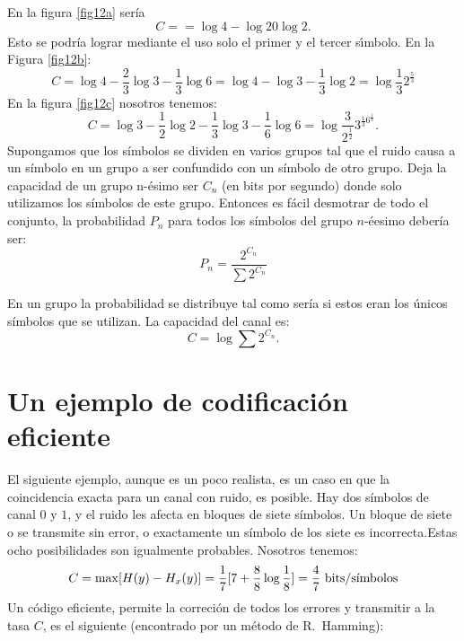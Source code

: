 En la figura \ref{fig12a} ser\'ia
\begin{equation}
  C = = \log{4} - \log{2} 0 \log{2}.
\end{equation}
Esto se podr\'ia lograr mediante el uso solo el primer y el tercer
s\'{\i}mbolo. En la Figura \ref{fig12b}:
\begin{equation}
  C = \log{4} - \frac{2}{3}\log{3} - \frac{1}{3}\log{6}
  = \log{4} - \log{3} - \frac{1}{3}\log{2}
  = \log{\frac{1}{3}} 2^{\frac{5}{3}}
\end{equation}
En la figura \ref{fig12c} nosotros tenemos:
\begin{equation}
  C = \log{3} - \frac{1}{2}\log{2} - \frac{1}{3}\log{3} - \frac{1}{6} \log{6}
  = \log  {\frac{3}{ 2^{\frac{1}{2}}}} 3^{\frac{1}{3} 6^{\frac{1}{6} }}.
\end{equation}
Supongamos que los s\'imbolos se dividen en varios grupos tal que el
ruido causa a un s\'imbolo en un grupo a ser confundido con un
s\'imbolo de otro grupo. Deja la capacidad de un grupo n-\'esimo ser
$C_n$ (en bits por segundo) donde solo utilizamos los s\'imbolos de
este grupo. Entonces es f\'acil desmotrar de todo el conjunto, la
probabilidad $P_n$ para todos los s\'imbolos del grupo $n$-\'{e}esimo
deber\'ia ser:
\begin{equation}
  P_n = \frac{2^{C_n}}{\sum 2^{C_n}}
\end{equation}

En un grupo la probabilidad se distribuye tal como ser\'ia si estos eran los \'unicos s\'imbolos que se utilizan. 
La capacidad del canal es:
\begin{equation}
  C = \log{\sum 2^{C_n}}.
\end{equation}

\clearpage

\chapter{Un ejemplo de codificaci\'on eficiente}
\label{sec:17}

El siguiente ejemplo, aunque es un poco realista, es un caso en que la
coincidencia exacta para un canal con ruido, es posible. Hay dos
s\'imbolos de canal $0$ y $1$, y el ruido les afecta en bloques de siete
s\'imbolos.  Un bloque de siete o se transmite sin error, o
exactamente un s\'imbolo de los siete es incorrecta.Estas ocho
posibilidades son igualmente probables. Nosotros tenemos:
\begin{equation}
C = \max [ H(y) - H_x(y) ]
= \frac{1}{7}[7 + \frac{8}{8}\log{\frac{1}{8}}]
= \frac{4}{7} \text{ bits}/\text{s\'{\i}mbolos}
\end{equation}
Un c\'odigo eficiente, permite la correci\'on de todos los errores y
transmitir a la tasa $C$, es el siguiente (encontrado por un m\'etodo
de R.\ Hamming):
